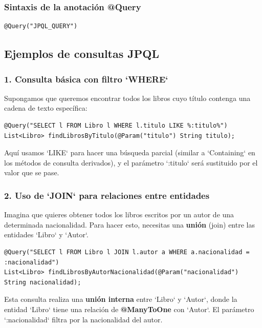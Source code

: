\documentclass[11pt]{article}
\begin{document}
\subsubsection{Sintaxis de la anotación @Query}
\label{sec:orgef40819}
\begin{verbatim}
@Query("JPQL_QUERY")
\end{verbatim}

\subsection{Ejemplos de consultas JPQL}
\label{sec:orgdcad3a8}
\subsubsection{1. Consulta básica con filtro `WHERE`}
\label{sec:org53dabc5}
Supongamos que queremos encontrar todos los libros cuyo título contenga una cadena de texto específica:

\begin{verbatim}
@Query("SELECT l FROM Libro l WHERE l.titulo LIKE %:titulo%")
List<Libro> findLibrosByTitulo(@Param("titulo") String titulo);
\end{verbatim}

Aquí usamos `LIKE` para hacer una búsqueda parcial (similar a `Containing` en los métodos de consulta derivados), y el parámetro `:titulo` será sustituido por el valor que se pase.

\subsubsection{2. Uso de `JOIN` para relaciones entre entidades}
\label{sec:orgdc38230}
Imagina que quieres obtener todos los libros escritos por un autor de una determinada nacionalidad. Para hacer esto, necesitas una \textbf{\textbf{unión}} (join) entre las entidades `Libro` y `Autor`.

\begin{verbatim}
@Query("SELECT l FROM Libro l JOIN l.autor a WHERE a.nacionalidad = :nacionalidad")
List<Libro> findLibrosByAutorNacionalidad(@Param("nacionalidad") String nacionalidad);
\end{verbatim}

Esta consulta realiza una \textbf{\textbf{unión interna}} entre `Libro` y `Autor`, donde la entidad `Libro` tiene una relación de \textbf{\textbf{@ManyToOne}} con `Autor`. El parámetro `:nacionalidad` filtra por la nacionalidad del autor.
\end{document}
